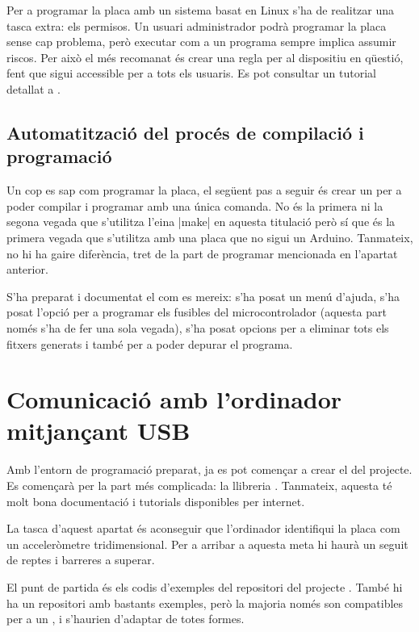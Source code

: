 Per a programar la placa amb un sistema basat en Linux s'ha de realitzar una
tasca extra: els permisos. Un usuari administrador podrà programar la placa
sense cap problema, però executar com a  un programa sempre implica
assumir riscos. Per això el més recomanat és crear una regla 
per al dispositiu en qüestió, fent que sigui accessible per a tots els usuaris.
Es pot consultar un tutorial detallat a \cite{CreateUdevRules}.

\subsection{Automatització del procés de compilació i programació}

Un cop es sap com programar la placa, el següent pas a seguir és crear un
 per a poder compilar i programar amb una única comanda.
No és la primera ni la segona vegada que s'utilitza l'eina \ord|make| en
aquesta titulació però sí que és la primera vegada que s'utilitza amb una placa
que no sigui un Arduino. Tanmateix, no hi ha gaire diferència, tret de la
part de programar mencionada en l'apartat anterior.

S'ha preparat i documentat el  com es mereix: s'ha posat un menú
d'ajuda, s'ha posat l'opció per a programar els fusibles del microcontrolador
(aquesta part només s'ha de fer una sola vegada), s'ha posat opcions per a
eliminar tots els fitxers generats i també per a poder depurar el programa.

\section{Comunicació amb l'ordinador mitjançant USB}

Amb l'entorn de programació preparat, ja es pot començar a crear el
 del projecte. Es començarà per la part més complicada: la
llibreria . Tanmateix, aquesta té molt bona documentació i
tutorials disponibles per internet.

La tasca d'aquest apartat és aconseguir que l'ordinador identifiqui la placa
com un acceleròmetre tridimensional. Per a arribar a aquesta meta hi haurà un
seguit de reptes i barreres a superar.

El punt de partida és els codis d'exemples del repositori del projecte
\cite{VusbProjects}.
També hi ha un repositori amb bastants exemples, però la majoria només son
compatibles per a un , i s'haurien d'adaptar de totes formes.

